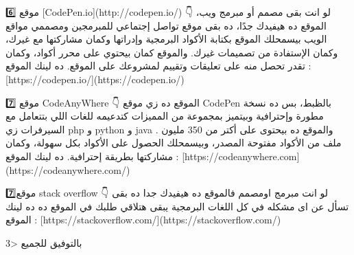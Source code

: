     6️⃣️ موقع [CodePen.io](http://codepen.io/) 👇
    لو انت بقى مصمم أو مبرمج ويب، الموقع ده هيفيدك جدًا، ده بقى موقع تواصل إجتماعي للمبرمجين ومصممي مواقع الويب بيسمحلك الموقع بكتابة الأكواد البرمجية وإدراتها وكمان مشاركتها مع غيرك، وكمان الإستفادة من تصميمات غيرك. والموقع كمان بيحتوي على محرر أكواد، وكمان تقدر تحصل منه على تعليقات وتقييم لمشروعك على الموقع.
    ده لينك الموقع : [https://codepen.io/](https://codepen.io/)
    
    7️⃣️ موقع CodeAnyWhere 👇
    الموقع ده زي موقع CodePen بالظبط، بس ده نسخة مطورة وإحترافية وبيتميز بمجموعة من المميزات كتدعيمه للغات اللي بتتعامل مع السيرفرات زي php و python و java . والموقع ده بيحتوى على أكتر من 350 مليون ملف من الأكواد مفتوحة المصدر، وبيسمحلك الحصول على الأكواد بكل سهولة، وكمان مشاركتها بطريقة إحترافية.
    ده لينك الموقع : [https://codeanywhere.com](https://codeanywhere.com/)
    
    7️⃣موقع stack overflow 👇
    لو انت مبرمج اومصمم فالموقع ده هيفيدك جدا ده بقى تسأل عن اى مشكله في كل اللغات البرمجية يبقى هتلاقي طلبك في  الموقع ده
    ده لينك الموقع : [https://stackoverflow.com/](https://stackoverflow.com/)
    
    بالتوفيق للجميع <3